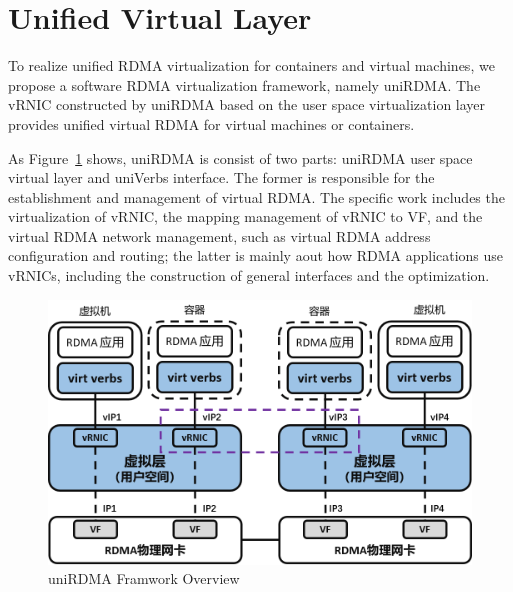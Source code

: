 \section{Unified Virtual Layer}
To realize unified RDMA virtualization for containers and virtual machines,  we propose a software RDMA virtualization framework, namely uniRDMA. The vRNIC constructed by uniRDMA based on the user space virtualization layer provides unified virtual RDMA for virtual machines or containers.

As Figure~\ref{fig:framework-overview} shows, uniRDMA is consist of two parts: uniRDMA user space virtual layer and uniVerbs interface. The former is responsible for the establishment and management of virtual RDMA. The specific work includes the virtualization of vRNIC, the mapping management of vRNIC to VF, and the virtual RDMA network management, such as virtual RDMA address configuration and routing; the latter is mainly aout how RDMA applications use vRNICs, including the construction of general interfaces and the optimization.

\begin{figure}[!ht]
	\centering
	\includegraphics[width=1.0\linewidth]{images/framework-overview}
	\caption{uniRDMA Framwork Overview}
	\label{fig:framework-overview}
\end{figure}
